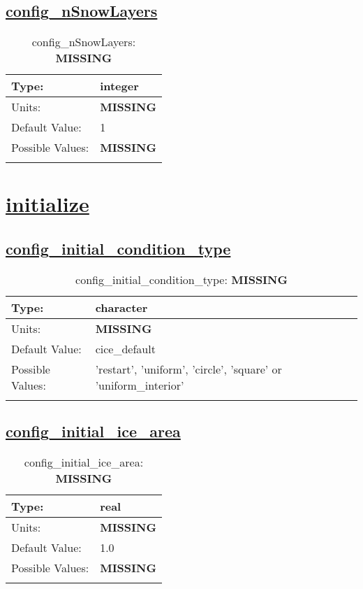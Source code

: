 \subsection[config\_nSnowLayers]{\hyperref[sec:nm_tab_dimensions]{config\_nSnowLayers}}
\label{subsec:nm_sec_config_nSnowLayers}
\begin{center}
\begin{longtable}{| p{2.0in} || p{4.0in} |}
    \hline
    Type: & integer \\
    \hline
    Units: & {\bf \color{red} MISSING} \\
    \hline
    Default Value: & 1 \\
    \hline
    Possible Values: & {\bf \color{red} MISSING} \\
    \hline
    \caption{config\_nSnowLayers: {\bf \color{red} MISSING}}
\end{longtable}
\end{center}
\section[initialize]{\hyperref[sec:nm_tab_initialize]{initialize}}
\label{sec:nm_sec_initialize}
\subsection[config\_initial\_condition\_type]{\hyperref[sec:nm_tab_initialize]{config\_initial\_condition\_type}}
\label{subsec:nm_sec_config_initial_condition_type}
\begin{center}
\begin{longtable}{| p{2.0in} || p{4.0in} |}
    \hline
    Type: & character \\
    \hline
    Units: & {\bf \color{red} MISSING} \\
    \hline
    Default Value: & cice\_default \\
    \hline
    Possible Values: & 'restart', 'uniform', 'circle', 'square' or 'uniform\_interior' \\
    \hline
    \caption{config\_initial\_condition\_type: {\bf \color{red} MISSING}}
\end{longtable}
\end{center}
\subsection[config\_initial\_ice\_area]{\hyperref[sec:nm_tab_initialize]{config\_initial\_ice\_area}}
\label{subsec:nm_sec_config_initial_ice_area}
\begin{center}
\begin{longtable}{| p{2.0in} || p{4.0in} |}
    \hline
    Type: & real \\
    \hline
    Units: & {\bf \color{red} MISSING} \\
    \hline
    Default Value: & 1.0 \\
    \hline
    Possible Values: & {\bf \color{red} MISSING} \\
    \hline
    \caption{config\_initial\_ice\_area: {\bf \color{red} MISSING}}
\end{longtable}
\end{center}
